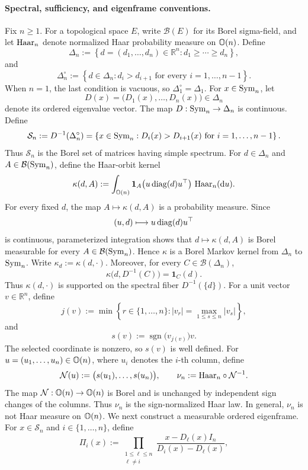 \paragraph{Spectral, sufficiency, and eigenframe conventions.}
Fix \(n\geq1\). For a topological space \(E\), write
\(\mathcal B(E)\) for its Borel sigma-field, and let \(\mathrm{Haar}_n\)
denote normalized Haar probability measure on \(\mathbb{O}(n)\). Define
\[
\Delta_n
:=
\left\{
d=(d_1,\ldots,d_n)\in\mathbb R^n:
d_1\geq\cdots\geq d_n
\right\},
\]
and
\[
\Delta_n^\circ
:=
\left\{
d\in\Delta_n:
d_i>d_{i+1}
\text{ for every }i=1,\ldots,n-1
\right\}.
\]
When \(n=1\), the last condition is vacuous, so
\(\Delta_1^\circ=\Delta_1\).
For \(x\in\mathrm{Sym}_n\), let
\[
D(x)
=
\bigl(D_1(x),\ldots,D_n(x)\bigr)
\in\Delta_n
\]
denote its ordered eigenvalue vector. The map
\(D:\mathrm{Sym}_n\to\Delta_n\) is continuous. Define
\[
\mathcal S_n
:=
D^{-1}(\Delta_n^\circ)
=
\left\{
x\in\mathrm{Sym}_n:
D_i(x)>D_{i+1}(x)
\text{ for }i=1,\ldots,n-1
\right\}.
\]
Thus \(\mathcal S_n\) is the Borel set of matrices having simple
spectrum.
For \(d\in\Delta_n\) and \(A\in\mathcal B(\mathrm{Sym}_n)\), define the
Haar-orbit kernel
\[
\kappa(d,A)
:=
\int_{\mathbb{O}(n)}
\mathbf 1_A\!\left(
u\operatorname{diag}(d)u^\top
\right)\,\mathrm{Haar}_n(\mathrm{d}u).
\]
For every fixed \(d\), the map \(A\mapsto\kappa(d,A)\) is a
probability measure. Since
\[
(u,d)\longmapsto u\operatorname{diag}(d)u^\top
\]
is continuous, parameterized integration shows that
\(d\mapsto\kappa(d,A)\) is Borel measurable for every
\(A\in\mathcal B(\mathrm{Sym}_n)\). Hence \(\kappa\) is a Borel Markov
kernel from \(\Delta_n\) to \(\mathrm{Sym}_n\). Write \(\kappa_d:=\kappa(d,\cdot)\). Moreover, for every
\(C\in\mathcal B(\Delta_n)\),
\[
\kappa\bigl(d,D^{-1}(C)\bigr)
=
\mathbf 1_C(d).
\]
Thus \(\kappa(d,\cdot)\) is supported on the spectral fiber
\(D^{-1}(\{d\})\).
For a unit vector \(v\in\mathbb R^n\), define
\[
j(v)
:=
\min\left\{
r\in\{1,\ldots,n\}:
|v_r|
=
\max_{1\leq s\leq n}|v_s|
\right\},
\]
and
\[
s(v)
:=
\operatorname{sgn}\!\bigl(v_{j(v)}\bigr)v.
\]
The selected coordinate is nonzero, so \(s(v)\) is well defined.
For \(u=(u_1,\ldots,u_n)\in\mathbb{O}(n)\), where \(u_i\) denotes the
\(i\)-th column, define
\[
\mathcal N(u)
:=
\bigl(s(u_1),\ldots,s(u_n)\bigr),
\qquad
\nu_n
:=
\mathrm{Haar}_n\circ\mathcal N^{-1}.
\]
The map \(\mathcal N:\mathbb{O}(n)\to\mathbb{O}(n)\) is Borel and is unchanged by
independent sign changes of the columns. Thus \(\nu_n\) is the
sign-normalized Haar law. In general, \(\nu_n\) is not Haar measure
on \(\mathbb{O}(n)\).
We next construct a measurable ordered eigenframe. For
\(x\in\mathcal S_n\) and \(i\in\{1,\ldots,n\}\), define
\[
\Pi_i(x)
:=
\prod_{\substack{1\leq\ell\leq n\\ \ell\neq i}}
\frac{x-D_\ell(x)I_n}{D_i(x)-D_\ell(x)},
\]
